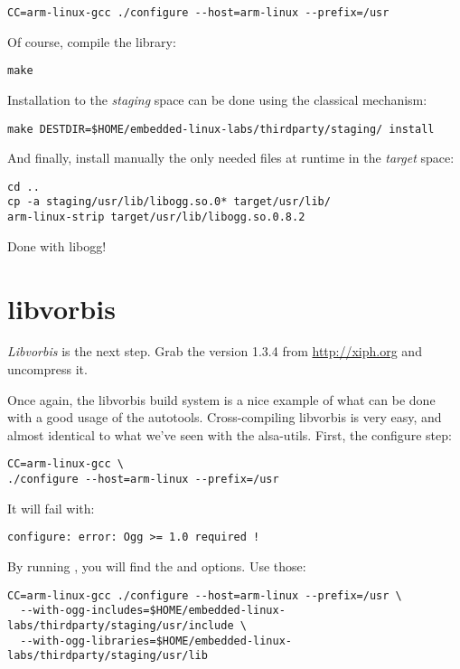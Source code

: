 \begin{verbatim}
CC=arm-linux-gcc ./configure --host=arm-linux --prefix=/usr
\end{verbatim}

Of course, compile the library:

\begin{verbatim}
make
\end{verbatim}

Installation to the {\em staging} space can be done using the
classical  mechanism:

\begin{verbatim}
make DESTDIR=$HOME/embedded-linux-labs/thirdparty/staging/ install
\end{verbatim}

And finally, install manually the only needed files at runtime in the
{\em target} space:

\begin{verbatim}
cd ..
cp -a staging/usr/lib/libogg.so.0* target/usr/lib/
arm-linux-strip target/usr/lib/libogg.so.0.8.2
\end{verbatim}

Done with libogg!

\section{libvorbis}

{\em Libvorbis} is the next step. Grab the version 1.3.4 from
\url{http://xiph.org} and uncompress it.

Once again, the libvorbis build system is a nice example of what can
be done with a good usage of the autotools. Cross-compiling libvorbis
is very easy, and almost identical to what we've seen with the
alsa-utils. First, the configure step:

\begin{verbatim}
CC=arm-linux-gcc \
./configure --host=arm-linux --prefix=/usr
\end{verbatim}

It will fail with:

\begin{verbatim}
configure: error: Ogg >= 1.0 required !
\end{verbatim}

By running , you will find the
 and  options.
Use those:

\begin{verbatim}
CC=arm-linux-gcc ./configure --host=arm-linux --prefix=/usr \
  --with-ogg-includes=$HOME/embedded-linux-labs/thirdparty/staging/usr/include \
  --with-ogg-libraries=$HOME/embedded-linux-labs/thirdparty/staging/usr/lib
\end{verbatim}

